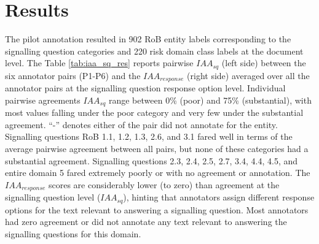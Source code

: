 \documentclass{IOS-Book-Article}
\begin{document}
\section{Results}
\label{sec:results}
%
The pilot annotation resulted in 902 RoB entity labels corresponding to the signalling question categories and 220 risk domain class labels at the document level.
The Table \ref{tab:iaa_sq_res} reports pairwise $IAA_{sq}$ (left side) between the six annotator pairs (P1-P6) and the $IAA_{response}$ (right side) averaged over all the annotator pairs at the signalling question response option level.
Individual pairwise agreements $IAA_{sq}$ range between 0\% (poor) and 75\% (substantial), with most values falling under the poor category and very few under the substantial agreement.
``-'' denotes either of the pair did not annotate for the entity. 
Signalling questions RoB 1.1, 1.2, 1.3, 2.6, and 3.1 fared well in terms of the average pairwise agreement between all pairs, but none of these categories had a substantial agreement.
Signalling questions 2.3, 2.4, 2.5, 2.7, 3.4, 4.4, 4.5, and entire domain 5 fared extremely poorly or with no agreement or annotation.
The $IAA_{response}$ scores are considerably lower (to zero) than agreement at the signalling question level ($IAA_{sq}$), hinting that annotators assign different response options for the text relevant to answering a signalling question. 
Most annotators had zero agreement or did not annotate any text relevant to answering the signalling questions for this domain.
\end{document}

